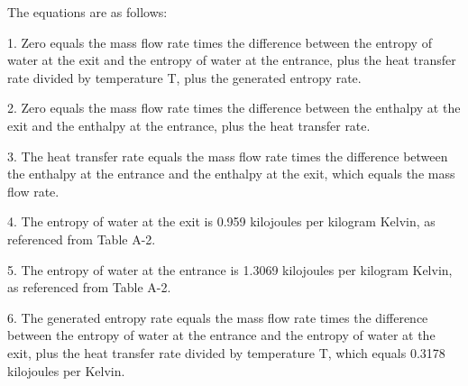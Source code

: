 The equations are as follows:

1. Zero equals the mass flow rate times the difference between the entropy of water at the exit and the entropy of water at the entrance, plus the heat transfer rate divided by temperature T, plus the generated entropy rate.

2. Zero equals the mass flow rate times the difference between the enthalpy at the exit and the enthalpy at the entrance, plus the heat transfer rate.

3. The heat transfer rate equals the mass flow rate times the difference between the enthalpy at the entrance and the enthalpy at the exit, which equals the mass flow rate.

4. The entropy of water at the exit is 0.959 kilojoules per kilogram Kelvin, as referenced from Table A-2.

5. The entropy of water at the entrance is 1.3069 kilojoules per kilogram Kelvin, as referenced from Table A-2.

6. The generated entropy rate equals the mass flow rate times the difference between the entropy of water at the entrance and the entropy of water at the exit, plus the heat transfer rate divided by temperature T, which equals 0.3178 kilojoules per Kelvin.
